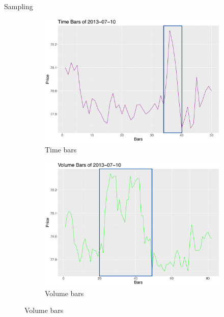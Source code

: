 \documentclass[usenames,dvipsnames]{beamer} %
\begin{document}
\begin{frame}{Sampling}
\begin{figure}[htbp]
	\centering	
	\begin{subfigure}{.5\textwidth}
		\centering
		\includegraphics[scale=.15]{img/timeZoomBis}
		\caption{Time bars}
	\end{subfigure}%
	\begin{subfigure}{.5\textwidth}
		\centering
		\includegraphics[scale=.15]{img/volumeZoomBis}
		\caption{Volume bars}
	\end{subfigure}%

	\vspace{.2cm}


\end{figure}
\end{frame}
\end{document}
